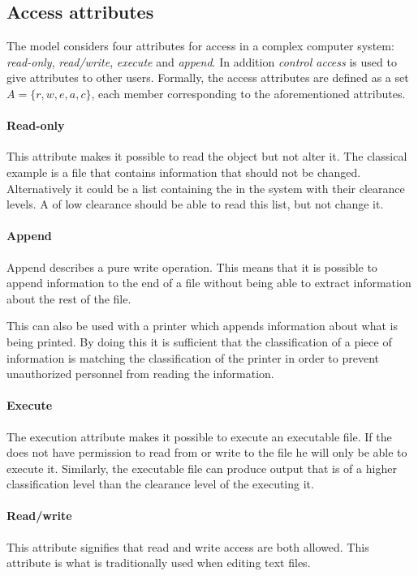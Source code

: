 \subsection{Access attributes}\label{blp:access_attributes}
The model considers four attributes for access in a complex computer system: \emph{read-only}, \emph{read/write}, \emph{execute} and \emph{append}.
In addition \emph{control access} is used to give attributes to other users.
Formally, the access attributes are defined as a set $A = \{ r, w, e, a, c \}$, each member corresponding to the aforementioned attributes.

\paragraph{Read-only}
This attribute makes it possible to read the object but not alter it.
The classical example is a file that contains information that should not be changed.
Alternatively it could be a list containing the \principals{} in the system with their clearance levels.
A \principal{} of low clearance should be able to read this list, but not change it.

\paragraph{Append}
Append describes a pure write operation.
This means that it is possible to append information to the end of a file without being able to extract information about the rest of the file.

This can also be used with a printer which appends information about what is being printed.
By doing this it is sufficient that the classification of a piece of information is matching the classification of the printer in order to prevent unauthorized personnel from reading the information.

\paragraph{Execute}
The execution attribute makes it possible to execute an executable file.
If the \principal{} does not have permission to read from or write to the file he will only be able to execute it.
Similarly, the executable file can produce output that is of a higher classification level than the clearance level of the \principal{} executing it.

\paragraph{Read/write}
This attribute signifies that read and write access are both allowed.
This attribute is what is traditionally used when editing text files.

